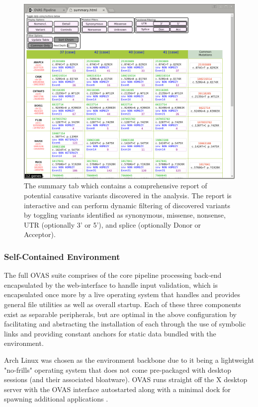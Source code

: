 \documentclass{bioinfo}
\def\app{OVAS}
\begin{document}
\begin{methods}
\begin{figure}[!tpb]
  \centerline{\includegraphics[width=\columnwidth]{report_small.jpg}}\caption{The summary tab which contains a comprehensive report of potential causative variants discovered in the analysis. The report is interactive and can perform dynamic filtering of discovered variants by toggling variants identified as synonymous, missense, nonsense, UTR (optionally 3' or 5'), and splice (optionally Donor or Acceptor).}\label{fig:report}
\end{figure}


\subsubsection{Self-Contained Environment}

The full \app{} suite comprises of the core pipeline processing back-end encapsulated by the web-interface to handle input validation, which is encapsulated once more by a live operating system that handles and provides general file utilities as well as overall startup. Each of these three components exist as separable peripherals, but are optimal in the above configuration by facilitating and abstracting the installation of each through the use of symbolic links and providing constant anchors for static data bundled with the environment.

Arch Linux was chosen as the environment backbone due to it being a lightweight "no-frills" operating system that does not come pre-packaged with desktop sessions (and their associated bloatware). \app{} runs straight off the X desktop server with the \app{} interface autostarted along with a minimal dock for spawning additional applications \citep{scheifler1986x}.


\end{methods}
\end{document}
